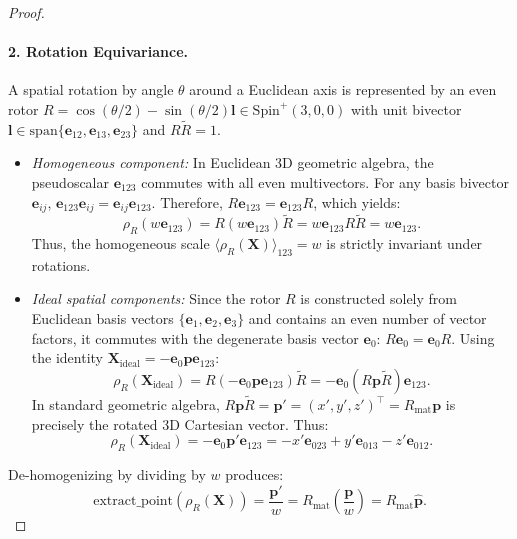\documentclass[10pt]{article}
\begin{document}
\begin{proof}
\paragraph{2. Rotation Equivariance.}
A spatial rotation by angle $\theta$ around a Euclidean axis is represented by an even rotor $R = \cos(\theta/2) - \sin(\theta/2)\mathbf{l} \in \mathrm{Spin}^+(3,0,0)$ with unit bivector $\mathbf{l} \in \mathrm{span}\{\mathbf{e}_{12}, \mathbf{e}_{13}, \mathbf{e}_{23}\}$ and $R \widetilde{R} = 1$.
\begin{itemize}
    \item \emph{Homogeneous component:} In Euclidean 3D geometric algebra, the pseudoscalar $\mathbf{e}_{123}$ commutes with all even multivectors. For any basis bivector $\mathbf{e}_{ij}$, $\mathbf{e}_{123} \mathbf{e}_{ij} = \mathbf{e}_{ij} \mathbf{e}_{123}$. Therefore, $R \mathbf{e}_{123} = \mathbf{e}_{123} R$, which yields:
    \begin{equation}
        \rho_R(w \mathbf{e}_{123}) = R (w \mathbf{e}_{123}) \widetilde{R} = w \mathbf{e}_{123} R \widetilde{R} = w \mathbf{e}_{123}.
    \end{equation}
    Thus, the homogeneous scale $\langle \rho_R(\mathbf{X}) \rangle_{123} = w$ is strictly invariant under rotations.
    \item \emph{Ideal spatial components:} Since the rotor $R$ is constructed solely from Euclidean basis vectors $\{\mathbf{e}_1, \mathbf{e}_2, \mathbf{e}_3\}$ and contains an even number of vector factors, it commutes with the degenerate basis vector $\mathbf{e}_0$: $R \mathbf{e}_0 = \mathbf{e}_0 R$.
    Using the identity $\mathbf{X}_{\text{ideal}} = -\mathbf{e}_0 \mathbf{p} \mathbf{e}_{123}$:
    \begin{equation}
        \rho_R(\mathbf{X}_{\text{ideal}}) = R (-\mathbf{e}_0 \mathbf{p} \mathbf{e}_{123}) \widetilde{R} = -\mathbf{e}_0 (R \mathbf{p} \widetilde{R}) \mathbf{e}_{123}.
    \end{equation}
    In standard geometric algebra, $R \mathbf{p} \widetilde{R} = \mathbf{p}' = (x', y', z')^\top = R_{\text{mat}} \mathbf{p}$ is precisely the rotated 3D Cartesian vector. Thus:
    \begin{equation}
        \rho_R(\mathbf{X}_{\text{ideal}}) = -\mathbf{e}_0 \mathbf{p}' \mathbf{e}_{123} = -x' \mathbf{e}_{023} + y' \mathbf{e}_{013} - z' \mathbf{e}_{012}.
    \end{equation}
\end{itemize}
De-homogenizing by dividing by $w$ produces:
\begin{equation}
    \mathrm{extract\_point}(\rho_R(\mathbf{X})) = \frac{\mathbf{p}'}{w} = R_{\text{mat}} \left(\frac{\mathbf{p}}{w}\right) = R_{\text{mat}} \hat{\mathbf{p}}.
\end{equation}


\end{proof}
\end{document}
